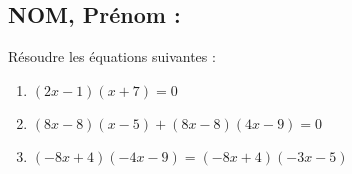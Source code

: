 \documentclass[a4paper,11pt,exos]{nsi}
\begin{document}
\subsection*{NOM, Prénom : \dotfill} 


\maketitle



\begin{exercice}
Résoudre les équations suivantes :
	\begin{enumerate}
		\item $(2x-1)(x+7)=0$
            \item $(8x-8)( x-5)+(8x-8)(4x-9)=0$
            \item $(-8x+4)( -4x-9)=(-8x+4)(-3x-5)$
	\end{enumerate}

\end{exercice}

\end{document}
